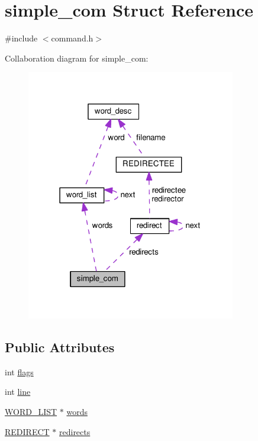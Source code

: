 \hypertarget{structsimple__com}{}\section{simple\+\_\+com Struct Reference}
\label{structsimple__com}


{\ttfamily \#include $<$command.\+h$>$}



Collaboration diagram for simple\+\_\+com\+:
\nopagebreak
\begin{figure}[H]
\begin{center}
\leavevmode
\includegraphics[width=259pt]{structsimple__com__coll__graph}
\end{center}
\end{figure}
\subsection*{Public Attributes}
\begin{DoxyCompactItemize}
\item 
int \hyperlink{structsimple__com_a3681da2bf1196015719c7c529a96bafe}{flags}
\item 
int \hyperlink{structsimple__com_a837f4e2e2eb00604e2eab7a78d32b089}{line}
\item 
\hyperlink{command_8h_ac42a7b781459884316a1f2ffe79e8a62}{W\+O\+R\+D\+\_\+\+L\+I\+ST} $\ast$ \hyperlink{structsimple__com_ae7a7f329e99d6e622ca9a8daef38c155}{words}
\item 
\hyperlink{command_8h_adeb9f5d937c92c7923aec48ad5e47d57}{R\+E\+D\+I\+R\+E\+CT} $\ast$ \hyperlink{structsimple__com_a8a9c45afa462969d01399d063320bd08}{redirects}
\end{DoxyCompactItemize}


